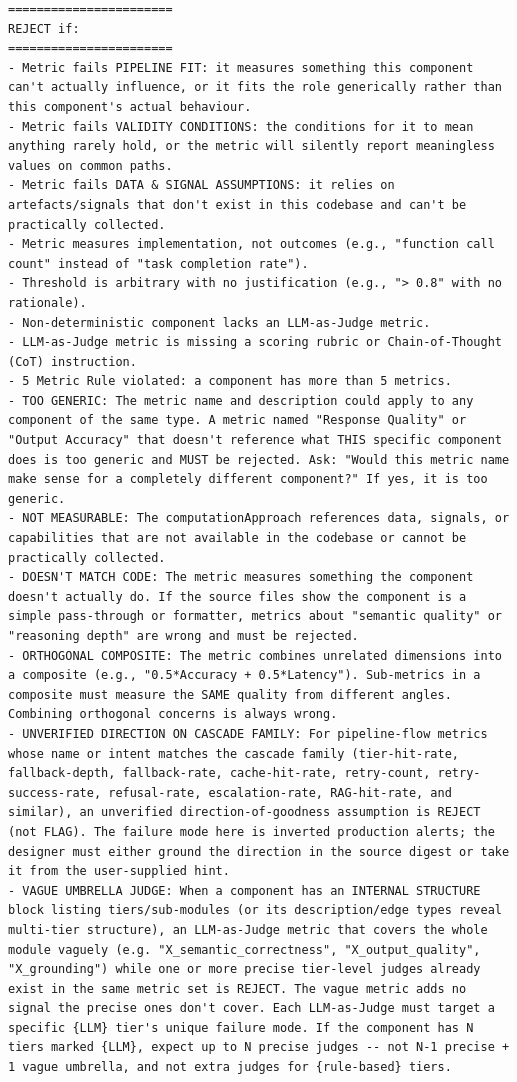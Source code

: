 \documentclass[11pt]{article}
\begin{document}
\begin{lstlisting}[style=prompt]
=======================
REJECT if:
=======================
- Metric fails PIPELINE FIT: it measures something this component can't actually influence, or it fits the role generically rather than this component's actual behaviour.
- Metric fails VALIDITY CONDITIONS: the conditions for it to mean anything rarely hold, or the metric will silently report meaningless values on common paths.
- Metric fails DATA & SIGNAL ASSUMPTIONS: it relies on artefacts/signals that don't exist in this codebase and can't be practically collected.
- Metric measures implementation, not outcomes (e.g., "function call count" instead of "task completion rate").
- Threshold is arbitrary with no justification (e.g., "> 0.8" with no rationale).
- Non-deterministic component lacks an LLM-as-Judge metric.
- LLM-as-Judge metric is missing a scoring rubric or Chain-of-Thought (CoT) instruction.
- 5 Metric Rule violated: a component has more than 5 metrics.
- TOO GENERIC: The metric name and description could apply to any component of the same type. A metric named "Response Quality" or "Output Accuracy" that doesn't reference what THIS specific component does is too generic and MUST be rejected. Ask: "Would this metric name make sense for a completely different component?" If yes, it is too generic.
- NOT MEASURABLE: The computationApproach references data, signals, or capabilities that are not available in the codebase or cannot be practically collected.
- DOESN'T MATCH CODE: The metric measures something the component doesn't actually do. If the source files show the component is a simple pass-through or formatter, metrics about "semantic quality" or "reasoning depth" are wrong and must be rejected.
- ORTHOGONAL COMPOSITE: The metric combines unrelated dimensions into a composite (e.g., "0.5*Accuracy + 0.5*Latency"). Sub-metrics in a composite must measure the SAME quality from different angles. Combining orthogonal concerns is always wrong.
- UNVERIFIED DIRECTION ON CASCADE FAMILY: For pipeline-flow metrics whose name or intent matches the cascade family (tier-hit-rate, fallback-depth, fallback-rate, cache-hit-rate, retry-count, retry-success-rate, refusal-rate, escalation-rate, RAG-hit-rate, and similar), an unverified direction-of-goodness assumption is REJECT (not FLAG). The failure mode here is inverted production alerts; the designer must either ground the direction in the source digest or take it from the user-supplied hint.
- VAGUE UMBRELLA JUDGE: When a component has an INTERNAL STRUCTURE block listing tiers/sub-modules (or its description/edge types reveal multi-tier structure), an LLM-as-Judge metric that covers the whole module vaguely (e.g. "X_semantic_correctness", "X_output_quality", "X_grounding") while one or more precise tier-level judges already exist in the same metric set is REJECT. The vague metric adds no signal the precise ones don't cover. Each LLM-as-Judge must target a specific {LLM} tier's unique failure mode. If the component has N tiers marked {LLM}, expect up to N precise judges -- not N-1 precise + 1 vague umbrella, and not extra judges for {rule-based} tiers.

\end{lstlisting}
\end{document}
